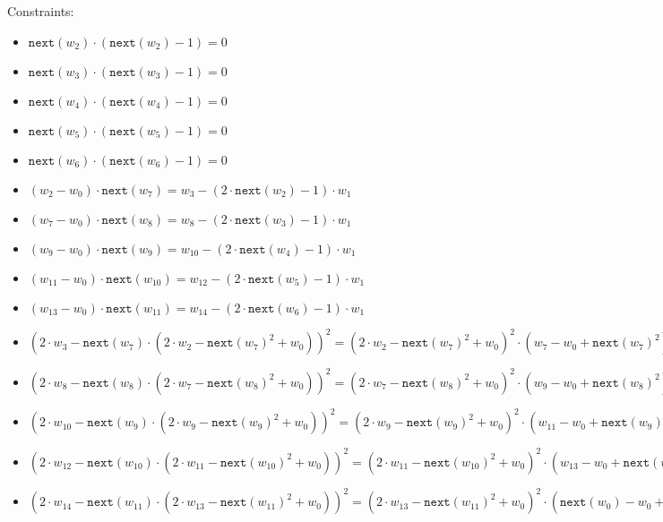 Constraints:
\begin{itemize}
    \item $\texttt{next}(w_2) \cdot (\texttt{next}(w_2) - 1) = 0$
    \item $\texttt{next}(w_3) \cdot (\texttt{next}(w_3) - 1) = 0$
    \item $\texttt{next}(w_4) \cdot (\texttt{next}(w_4) - 1) = 0$
    \item $\texttt{next}(w_5) \cdot (\texttt{next}(w_5) - 1) = 0$
    \item $\texttt{next}(w_6) \cdot (\texttt{next}(w_6) - 1) = 0$ \\

    \item $(w_{2} - w_{0}) \cdot \texttt{next}(w_7) = w_3 - (2 \cdot \texttt{next}(w_{2}) - 1) \cdot w_1$
    \item $(w_{7} - w_{0}) \cdot \texttt{next}(w_8) = w_8 - (2 \cdot \texttt{next}(w_{3}) - 1) \cdot w_1$
    \item $(w_{9} - w_{0}) \cdot \texttt{next}(w_9) = w_{10} - (2 \cdot \texttt{next}(w_{4}) - 1) \cdot w_1$
    \item $(w_{11} - w_{0}) \cdot \texttt{next}(w_{10}) = w_{12} - (2 \cdot \texttt{next}(w_{5}) - 1) \cdot w_1$
    \item $(w_{13} - w_{0}) \cdot \texttt{next}(w_{11}) = w_{14} - (2 \cdot \texttt{next}(w_{6}) - 1) \cdot w_1$ \\


    \item $(2\cdot w_{3} - \texttt{next}(w_7) \cdot (2 \cdot w_2 - \texttt{next}(w_7)^2 + w_{0}))^2 =  (2 \cdot w_2 - \texttt{next}(w_7)^2 + w_{0})^2 \cdot (w_7 - w_0 + \texttt{next}(w_7)^2)$
    \item $(2\cdot w_{8} - \texttt{next}(w_8) \cdot (2 \cdot w_7 - \texttt{next}(w_8)^2 + w_{0}))^2 =  (2 \cdot w_7 - \texttt{next}(w_8)^2 + w_{0})^2 \cdot (w_9 - w_0 + \texttt{next}(w_8)^2)$
    \item $(2\cdot w_{10} - \texttt{next}(w_9) \cdot (2 \cdot w_9 - \texttt{next}(w_9)^2 + w_{0}))^2 =  (2 \cdot w_9 - \texttt{next}(w_9)^2 + w_{0})^2 \cdot (w_{11} - w_0 + \texttt{next}(w_9)^2)$
    \item $(2\cdot w_{12} - \texttt{next}(w_{10}) \cdot (2 \cdot w_{11} - \texttt{next}(w_{10})^2 + w_{0}))^2 =  (2 \cdot w_{11} - \texttt{next}(w_{10})^2 + w_{0})^2 \cdot (w_{13} - w_0 + \texttt{next}(w_{10})^2)$
    \item $(2\cdot w_{14} - \texttt{next}(w_{11}) \cdot (2 \cdot w_{13} - \texttt{next}(w_{11})^2 + w_{0}))^2 =  (2 \cdot w_{13} - \texttt{next}(w_{11})^2 + w_{0})^2 \cdot (\texttt{next}(w_0) - w_0 + \texttt{next}(w_{11})^2)$ \\


\end{itemize}
